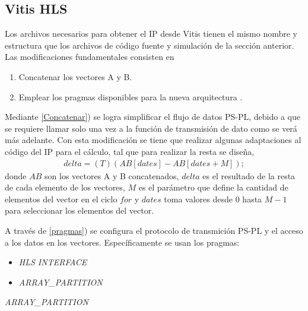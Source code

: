 \documentclass[conference]{IEEEtran}
\begin{document}
 \subsection{Vitis HLS}
 Los archivos necesarios para obtener el IP desde Vitis tienen el mismo nombre  y estructura que los archivos de código fuente y simulación de  la sección anterior. Las modificaciones fundamentales consisten en 
 \begin{enumerate}
     \item Concatenar los vectores A y B. \label{Concatenar}
     \item Emplear los pragmas disponibles para la nueva arquitectura . \label{pragmas}
 \end{enumerate}
 Mediante \ref{Concatenar})  se logra simplificar el flujo de datos PS-PL, debido a que se requiere llamar solo una vez a la función de transmisión de dato como se verá más adelante. Con esta modificación se tiene que  realizar algunas  adaptaciones al código del IP para el cálculo, tal que para realizar la resta se diseña,
 \begin{align}
     delta=(T)(AB[dates]-AB[dates+M]);
 \end{align}
 donde $AB$ son los vectores A y B concatenados, $delta$ es el resultado de la resta de cada elemento de los vectores, $M$ es el parámetro que define la cantidad de elementos del vector en el ciclo $for$ y $dates$ toma valores desde $0$ hasta $M-1$ para seleccionar los elementos del vector.\par
 A través de \ref{pragmas}) se configura el protocolo de transmición PS-PL y el acceso a los datos en los vectores.  Específicamente se usan los pragmas:
 \begin{itemize}
     \item  \textit{ HLS  INTERFACE}
     \item   \textit{ARRAY\_PARTITION}
 \end{itemize}
 \textit{ARRAY\_PARTITION}
\end{document}
